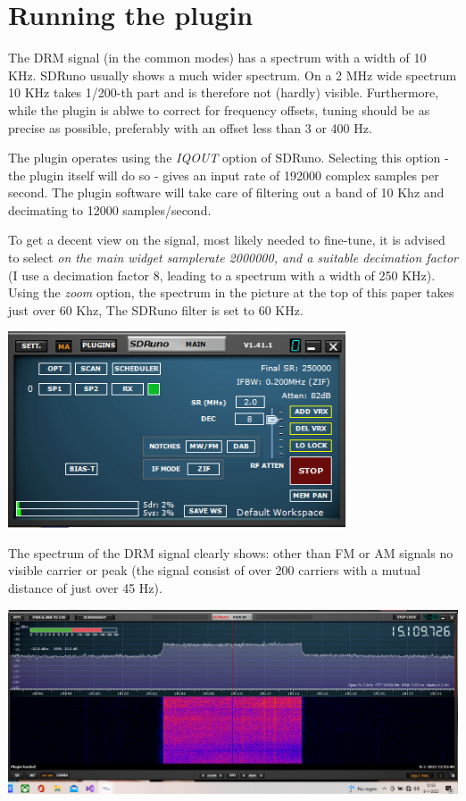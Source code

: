 \documentclass[10pt]{article}
\begin{document}
\section{Running the plugin}
The DRM signal (in the common modes)
has a spectrum with a width of 10 KHz. SDRuno usually shows
a much wider spectrum. On a 2 MHz wide spectrum 10 KHz takes 1/200-th part
and is therefore not (hardly) visible. Furthermore, while the plugin
is ablwe to correct for frequency offsets, tuning should be as precise
as possible, preferably with an offset less than 3 or 400 Hz.
\par
The plugin operates using the {\em IQOUT} option of SDRuno. Selecting
this option - the plugin itself will do so - gives an input rate
of 192000 complex samples per second. The plugin software will take
care of filtering out a band of 10 Khz and decimating to 12000 samples/second.
\par
To get a decent view on the signal, most likely needed to fine-tune,
it is advised to select {\em on the main widget samplerate 2000000,
and a suitable decimation factor} (I use a decimation factor 8, leading to a
spectrum with a width of 250 KHz).
Using the {\em zoom}  option, the spectrum in the picture at the
top of this paper takes just over 60 Khz,
The SDRuno filter is set to 60 KHz.

\includegraphics[width=100mm]{drm-main-widget.png}

The spectrum of the DRM signal clearly shows: other than FM or AM signals 
no visible carrier or peak (the signal consist of over 200 carriers
with a mutual distance of just over 45 Hz).

\includegraphics[width=150mm]{drm-zoom.png}
\end{document}
